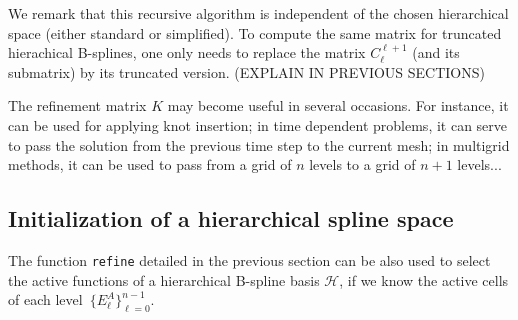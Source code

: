 \documentclass[12pt,a4paper,pdftex]{article}
\theoremstyle{plain}
\theoremstyle{definition}
\theoremstyle{remark}
\newcommand{\Rd}{\color{red}}
\newcommand\HH{\mathcal H}
\begin{document}
We remark that this recursive algorithm is independent of the chosen hierarchical space (either standard or simplified). To compute the same matrix for truncated hierachical B-splines, one only needs to replace the matrix $C_\ell^{\ell+1}$ (and its submatrix) by its truncated version. {\Rd (EXPLAIN IN PREVIOUS SECTIONS)}

The refinement matrix $K$ may become useful in several occasions. For instance, it can be used for applying knot insertion; in time dependent problems, it can serve to pass the solution from the previous time step to the current mesh; in multigrid methods, it can be used to pass from a grid of $n$ levels to a grid of $n+1$ levels...

\subsection{Initialization of a hierarchical spline space}

The function \texttt{refine} detailed in the previous section can be also used to select the active functions of a hierarchical B-spline basis $\HH$, if we know the active cells of each level~$\{E^A_\ell\}_{\ell=0}^{n-1}$. 
\end{document}
